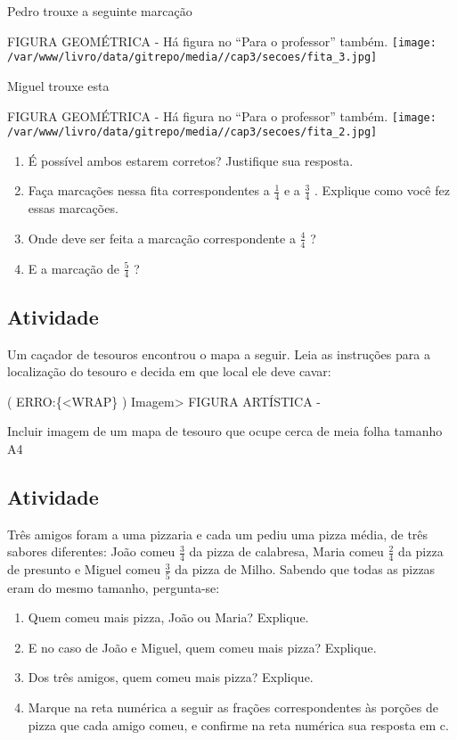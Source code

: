 \documentclass[a4,12pt]{book}
\begin{document}
Pedro trouxe a seguinte marcação 
\begin{imagem*}[breakable]{}{}   FIGURA GEOMÉTRICA - Há figura no   ``Para o professor''   também.  
    \texttt{[image: /var/www/livro/data/gitrepo/media//cap3/secoes/fita\_3.jpg]}  
\end{imagem*}

Miguel trouxe esta
\begin{imagem*}[breakable]{}{}   FIGURA GEOMÉTRICA - Há figura no   ``Para o professor''   também.  
    \texttt{[image: /var/www/livro/data/gitrepo/media//cap3/secoes/fita\_2.jpg]}  
\end{imagem*}

\begin{enumerate} [\quad a)] %
  \item     É possível ambos estarem corretos? Justifique sua resposta. 
  \item     Faça marcações nessa fita correspondentes a     $\frac{1}{4}$     e a     $\frac{3}{4}$    . Explique como você fez essas marcações.
  \item     Onde deve ser feita a marcação correspondente a     $\frac{4}{4}$    ?
  \item     E a marcação de     $\frac{5}{4}$    ? 
\end{enumerate} %

\subsection{Atividade}

Um caçador de tesouros encontrou o mapa a seguir. Leia as instruções para a localização do tesouro e decida em que local ele deve cavar:

( ERRO:\{<WRAP\} ) Imagem> FIGURA ARTÍSTICA -

Incluir imagem de um mapa de tesouro que ocupe cerca de meia folha tamanho A4 

\subsection{Atividade}

Três amigos foram a uma pizzaria e cada um pediu uma pizza média, de três sabores diferentes: João comeu $\frac{3}{4}$ da pizza de calabresa, Maria comeu  $\frac{2}{4}$ da pizza de presunto e Miguel comeu $\frac{3}{5}$ da pizza de Milho. Sabendo que todas as pizzas eram do mesmo tamanho, pergunta-se:
\begin{enumerate} [\quad a)] %
  \item     Quem comeu mais pizza, João ou Maria? Explique.
  \item     E no caso de João e Miguel, quem comeu mais pizza? Explique.
  \item     Dos três amigos, quem comeu mais pizza? Explique.
  \item     Marque na reta numérica a seguir as frações correspondentes às porções de pizza que cada amigo comeu, e confirme na reta numérica sua resposta em c.
\end{enumerate} %
\end{document}
